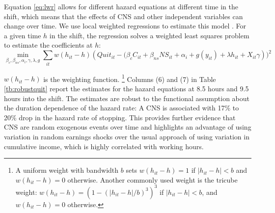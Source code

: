 \documentclass[reviewmode,AEJ]{AEA}
\begin{document}
Equation \eqref{eq:lwr} allows for different hazard equations at different time in the shift, which means that the effects of %
CNS and other independent variables can change over time. We use local weighted regressions to estimate this model \citep{cleveland1988locally}. For a given time $h$ in the shift, the regression solves a weighted least squares problem to estimate the coefficients at $h$:
\[\min_{\beta_c, \beta_{ns}, \alpha_i, \gamma, \lambda, g} \sum_{it} w(h_{it}-h) \left(Quit_{it} - (\beta_cC_{it} + \beta_{ns}{NS}_{it} + \alpha_i + g(y_{it}) + \lambda h_{it} + X_{it}\gamma\right))^2\]

$w(h_{it}-h)$ is the weighting function.%
\footnote{A uniform weight with bandwidth $b$ sets $w(h_{it}-h) = 1$ if $|h_{it}-h|<b$ and $w(h_{it}-h) = 0$ otherwise. Another commonly used weight is the tricube weight: $w(h_{it}-h) = \left(1-(|h_{it}-h|/b)^3\right)^3$ if $|h_{it}-h|<b$, and $w(h_{it}-h) = 0$ otherwise.} 
Columns (6) and (7) in Table \ref{tb:robustquit} report the estimates for the hazard equations at 8.5 hours and 9.5 hours into the shift. The estimates are robust to the functional assumption about the duration dependence of the hazard rate: A CNS is associated with 17\% to 20\% drop in the hazard rate of stopping. 
This provides further evidence that CNS are random exogenous events over time
and highlights an advantage of using variation in random earnings shocks over 
the usual approach of using variation in cumulative income, which is highly correlated
with working hours.


\end{document}

